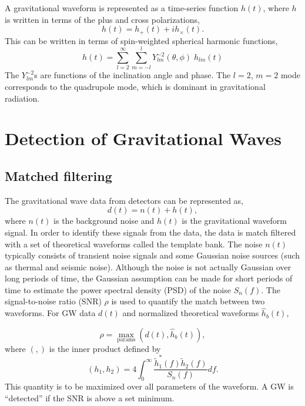 \documentclass{article}
\begin{document}
A gravitational waveform is represented
as a time-series function $h(t)$, where $h$ is written in terms of
the plus and cross polarizations,
\begin{equation}
    h(t) = h_{+}(t) + ih_{\times}(t). \label{ComplexTimeSeries}
\end{equation}
This can be written in terms of spin-weighted spherical harmonic functions,
\begin{equation}
    h(t) = \sum_{l=2}^{\infty} \sum_{m=-l}^{l} Y^{-2}_{lm}(\theta, \phi) \; h_{lm}(t) \label{SpinWheighted}
\end{equation}
The $Y^{-2}_{lm}$s are functions of the inclination angle and phase. The $l=2$, $m=2$ mode corresponds to the quadrupole mode,
which is dominant in gravitational radiation.

\section{Detection of Gravitational Waves}
\subsection{Matched filtering}
The gravitational wave data from detectors can be represented as,
\begin{equation}
    d(t) = n(t) + h(t) ,\label{GWData}
\end{equation}
where $n(t)$ is the background noise and $h(t)$ is the gravitational waveform signal. In order to identify these signals from the data, the data is match filtered with a set of theoretical waveforms called the template bank.
The noise $n(t)$ typically consists of transient noise signals and some Gaussian noise sources (such as thermal and seismic noise). Although the noise is not actually Gaussian over long periods of time, the Gaussian assumption can be made for short periods of time to estimate the power spectral density (PSD) of the noise $S_n(f)$. 
The signal-to-noise ratio (SNR) $\rho$ is used to quantify the match between two waveforms. For GW data $d(t)$ and normalized theoretical waveforms $\hat h_b(t)$,

\begin{equation}
    \rho = \max_\text{params} \left( d(t), \hat h_b (t)\right), \label{SNR}
\end{equation}
where $(,)$ is the inner product defined by
\begin{equation}
    (h_1, h_2) = 4 \int_{0}^{\infty} \frac{\tilde h_1^* (f)
    \tilde h_2 (f)}{S_n(f)}df.
\end{equation}
This quantity is to be maximized over all parameters of the waveform. A GW is ``detected'' if the SNR is above a set minimum.
\end{document}
